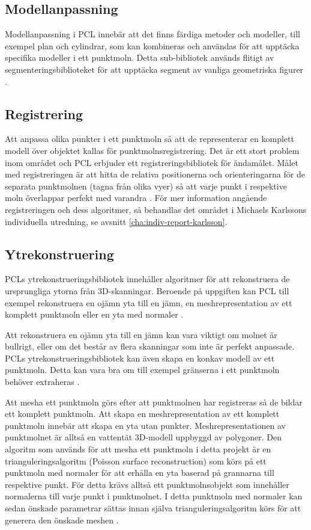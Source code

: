 \subsection{Modellanpassning}
Modellanpassning i PCL innebär att det finns färdiga metoder och modeller, till exempel plan och cylindrar, som kan kombineras och användas för att upptäcka specifika modeller i ett punktmoln. Detta sub-bibliotek används flitigt av segmenteringsbiblioteket för att upptäcka segment av vanliga geometriska figurer \cite{pcl_model_fitting}.

\subsection{Registrering}
Att anpassa olika punkter i ett punktmoln så att de representerar en komplett modell över objektet kallas för punktmolnsregistrering. Det är ett stort problem inom området och PCL erbjuder ett registreringsbibliotek för ändamålet. Målet med registreringen är att hitta de relativa positionerna och orienteringarna för de separata punktmolnen (tagna från olika vyer) så att varje punkt i respektive moln överlappar perfekt med varandra \cite{pcl_registration}. För mer information angående registreringen och dess algoritmer, så behandlas det området i Michaels Karlssons individuella utredning, se avsnitt \ref{cha:indiv-report-karlsson}.

\subsection{Ytrekonstruering}
PCLs ytrekonstrueringsbibliotek innehåller algoritmer för att rekonstruera de ursprungliga ytorna från 3D-skanningar. Beroende på uppgiften kan PCL till exempel rekonstruera en ojämn yta till en jämn, en meshrepresentation av ett komplett punktmoln eller en yta med normaler \cite{pcl_surface_reconstruction}. 

Att rekonstruera en ojämn yta till en jämn kan vara viktigt om molnet är bullrigt, eller om det består av flera skanningar som inte är perfekt anpassade. PCLs ytrekonstrueringsbibliotek kan även skapa en konkav modell av ett punktmoln. Detta kan vara bra om till exempel gränserna i ett punktmoln behöver extraheras \cite{pcl_surface_reconstruction}.

Att mesha ett punktmoln görs efter att punktmolnen har registreras så de bildar ett komplett punktmoln. Att skapa en meshrepresentation av ett komplett punktmoln innebär att skapa en yta utan punkter. Meshrepresentationen av punktmolnet är alltså en vattentät 3D-modell uppbyggd av polygoner. Den algoritm som används för att mesha ett punktmoln i detta projekt är en trianguleringsalgoritm (Poisson surface reconstruction) som körs på ett punktmoln med normaler för att erhålla en yta baserad på grannarna till respektive punkt. För detta krävs alltså ett punktmolnsobjekt som innehåller normalerna till varje punkt i punktmolnet. I detta punktmoln med normaler kan sedan önskade parametrar sättas innan själva trianguleringsalgoritm körs för att generera den önskade meshen \cite{pcl_surface_reconstruction}\cite{pcl_triangulation_algorithm}. 

